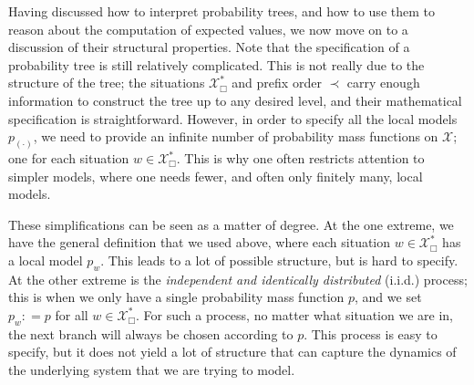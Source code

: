 \documentclass[graybox]{svmult}
\newcommand{\states}{\mathcal{X}}
\newcommand{\coloneqq}{:\!=}
\begin{document}
Having discussed how to interpret probability trees, and how to use them to reason about the computation of expected values, we now move on to a discussion of their structural properties. Note that the specification of a probability tree is still relatively complicated. This is not really due to the structure of the tree; the situations $\states^*_\Box$ and prefix order $\prec$ carry enough information to construct the tree up to any desired level, and their mathematical specification is straightforward. However, in order to specify all the local models $p_{(\cdot)}$, we need to provide an infinite number of probability mass functions on $\states$; one for each situation $w\in\states^*_\Box$. This is why one often restricts attention to simpler models, where one needs fewer, and often only finitely many, local models.

These simplifications can be seen as a matter of degree. At the one extreme, we have the general definition that we used above, where each situation $w\in\states^*_\Box$ has a local model $p_w$. This leads to a lot of possible structure, but is hard to specify. At the other extreme is the \emph{independent and identically distributed} (i.i.d.) process; this is when we only have a single probability mass function $p$, and we set $p_w\coloneqq p$ for all $w\in\states^*_\Box$. For such a process, no matter what situation we are in, the next branch will always be chosen according to $p$. This process is easy to specify, but it does not yield a lot of structure that can capture the dynamics of the underlying system that we are trying to model.
\end{document}
